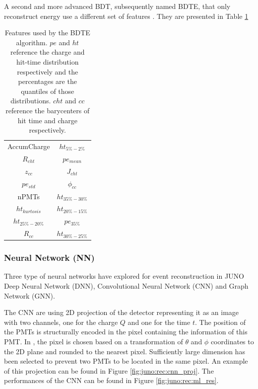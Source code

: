 \documentclass[../main.tex]{subfiles}
\begin{document}
A second and more advanced BDT, subsequently named BDTE, that only reconstruct energy use a different set of features \cite{gavrikov_energy_2022}. They are presented in Table \ref{tab:juno:rec:bdte}

\begin{table}
  \centering
  \begin{tabular}{|c|c|}
    \hline
    AccumCharge &  $ht_{5\%-2\%}$ \\
    $R_{cht}$ & $pe_{mean}$ \\
    $z_{cc}$ & $J_{cht}$ \\
    $pe_{std}$ & $\phi_{cc}$ \\
    nPMTs &  $ht_{35\%-30\%}$\\
    $ht_{kurtosis}$ & $ht_{20\%-15\%}$ \\
    $ht_{25\%-20\%}$ & $pe_{35\%}$ \\
    $R_{cc}$ & $ht_{30\%-25\%}$ \\
    \hline

  \end{tabular}
  \caption{Features used by the BDTE algorithm. $pe$ and $ht$ reference the charge and hit-time distribution respectively and the percentages are the quantiles of those distributions. $cht$ and $cc$ reference the barycenters of hit time and charge respectively.}
  \label{tab:juno:rec:bdte}
\end{table}

\subsubsection{Neural Network (NN)}
Three type of neural networks have explored for event reconstruction in JUNO Deep Neural Network (DNN), Convolutional Neural Network (CNN) and Graph Network (GNN).

The CNN are using 2D projection of the detector representing it as an image with two channels, one for the charge $Q$ and one for the time $t$. The position of the PMTs is structurally encoded in the pixel containing the information of this PMT. In \cite{qian_vertex_2021}, the pixel is chosen based on a transformation of $\theta$ and $\phi$ coordinates to the 2D plane and rounded to the nearest pixel. Sufficiently large dimension has been selected to prevent two PMTs to be located in the same pixel. An example of this projection can be found in Figure \ref{fig:juno:rec:cnn_proj}. The performances of the CNN can be found in Figure \ref{fig:juno:rec:ml_res}.
\end{document}
